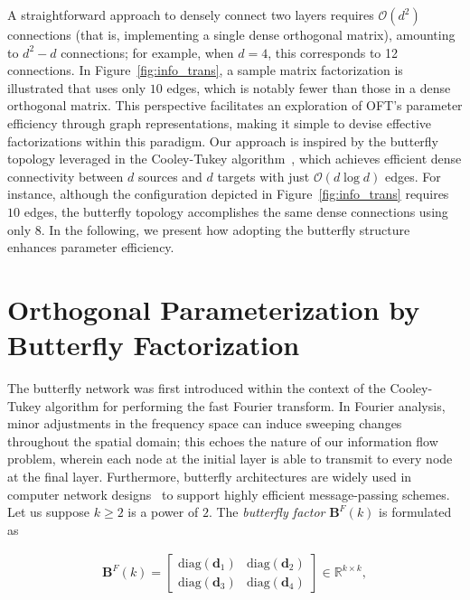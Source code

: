 A straightforward approach to densely connect two layers requires $\mathcal{O}(d^2)$ connections (that is, implementing a single dense orthogonal matrix), amounting to $d^2-d$ connections; for example, when $d=4$, this corresponds to 12 connections. In Figure~\ref{fig:info_trans}, a sample matrix factorization is illustrated that uses only $10$ edges, which is notably fewer than those in a dense orthogonal matrix. This perspective facilitates an exploration of OFT’s parameter efficiency through graph representations, making it simple to devise effective factorizations within this paradigm. Our approach is inspired by the butterfly topology leveraged in the Cooley-Tukey algorithm~\cite{cooley1965algorithm}, which achieves efficient dense connectivity between $d$ sources and $d$ targets with just $\mathcal{O}(d\log d)$ edges. For instance, although the configuration depicted in Figure~\ref{fig:info_trans} requires $10$ edges, the butterfly topology accomplishes the same dense connections using only $8$. In the following, we present how adopting the butterfly structure enhances parameter efficiency.

\section{Orthogonal Parameterization by Butterfly Factorization}

The butterfly network was first introduced within the context of the Cooley-Tukey algorithm for performing the fast Fourier transform. In Fourier analysis, minor adjustments in the frequency space can induce sweeping changes throughout the spatial domain; this echoes the nature of our information flow problem, wherein each node at the initial layer is able to transmit to every node at the final layer. Furthermore, butterfly architectures are widely used in computer network designs~\cite{solihin2015fundamentals,li2011linear} to support highly efficient message-passing schemes. Let us suppose $k\geq 2$ is a power of $2$. The \emph{butterfly factor} $\bm{B}^F(k)$ is formulated as

\begin{equation}\label{eq:but_factor}
\begin{aligned}
    \bm{B}^F(k)=\begin{bmatrix}
    \text{diag}(\bm{d}_1) & \text{diag}(\bm{d}_2) \\
    \text{diag}(\bm{d}_3) & \text{diag}(\bm{d}_4)
    \end{bmatrix}\in\mathbb{R}^{k\times k},
\end{aligned}
\end{equation}

